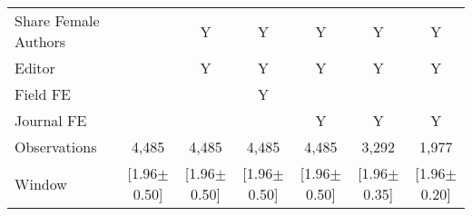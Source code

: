 \begin{tabular}{l*{6}{c}}
Share Female Authors &         &        Y&        Y&        Y&        Y&        Y\\
Editor          &         &        Y&        Y&        Y&        Y&        Y\\
Field FE        &         &         &        Y&         &         &         \\
Journal FE      &         &         &         &        Y&        Y&        Y\\
\hline
Observations    &    4,485&    4,485&    4,485&    4,485&    3,292&    1,977\\
Window          &[1.96$\pm$0.50]&[1.96$\pm$0.50]&[1.96$\pm$0.50]&[1.96$\pm$0.50]&[1.96$\pm$0.35]&[1.96$\pm$0.20]\\
\hline\hline
\end{tabular}
